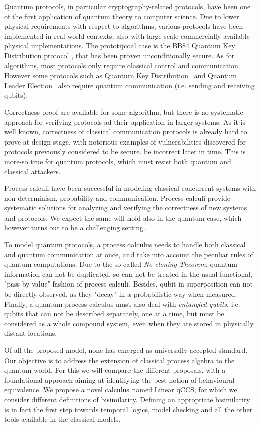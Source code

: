 Quantum protocols, in particular cryptography-related protocols, have been  one of the first application 
of quantum theory to computer science. Due to lower physical
requirements with respect to algorithms, various protocols have been implemented
in real world contexts, also with large-scale commercially available physical implementations.
The prototipical case is the BB84 Quantum Key Distribution
protocol , that has been proven unconditionally secure. As for algorithms, most protocols only require
classical control and communication. However some protocols such as Quantum Key
Distribution~\cite{poppe_practical_2004} and Quantum Leader
Election~\cite{tani_exact_2012} also require quantum communication (i.e. sending and receiving qubits).


Correctness proof are available for some algorithm, but there is no systematic approach for verifying protocols ad their application in larger systems.
As it is well known, correctness of classical communication protocols is already hard to prove at design stage, with notorious examples of vulnerabilities discovered for protocols previously considered to be secure.
be incorrect later in time. This is more-so true for quantum protocols, which must resist both quantum and classical attackers.


Process calculi have been successful in modeling classical concurrent systems with non-determinism, probability and communication. Process calculi provide systematic solutions for analyzing and verifying the correctness of new systems and protocols. We expect the same will hold also in the quantum case, which however turns out to be a challenging setting.


To model quantum protocols, a process calculus needs to handle both classical and quantum communication at once, and take into account the peculiar rules of quantum computations. Due to the so called \textit{No-cloning Theorem}, quantum information can not be duplicated, so can not be treated in the usual functional, "pass-by-value" fashion of process calculi. Besides, qubit in superposition can not be directly observed, as they "decay" in a probabilistic way when measured. Finally, a quantum process calculus must also deal with \textit{entangled qubits}, i.e. qubits that can not be described separately, one at a time, but must be considered as a whole compound system, even when they are stored in physically distant locations.

Of all the proposed model, none has emerged as universally accepted standard. Our objective is to address the extension of classical process algebra to the quantum world. For this we will compare the different proposals, with a foundational approach aiming at identifying the best notion of behavioural equivalence. We propose a novel calculus named Linear qCCS, for which we consider different definitions of bisimilarity.
Defining an appropriate bisimilarity is in fact the first step towards temporal logics, model checking and all the other tools available in the classical models.


